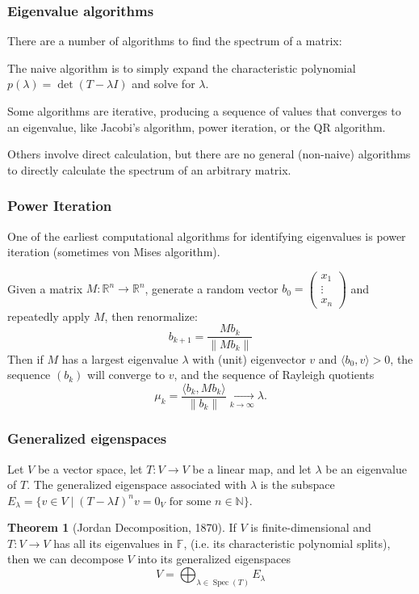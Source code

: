 \documentclass{beamer}
\newcommand{\R}{\mathbb{R}}
\newcommand{\N}{\mathbb{N}}
\DeclareMathOperator{\Spec}{Spec}
\newcommand{\norm}[1]{\left\lVert#1\right\rVert}
\theoremstyle{definition}
\newtheorem*{theorem*}{Theorem}
\begin{document}
\begin{frame}
    \frametitle{Eigenvalue algorithms}

    There are a number of algorithms to find the spectrum of a matrix:

    \pause
    The naive algorithm is to simply expand the characteristic polynomial $p(\lambda) = \det(T - \lambda I)$ and solve for $\lambda$.

    \pause
    Some algorithms are iterative, producing a sequence of values that converges to an eigenvalue, like Jacobi's algorithm, power iteration, or the QR algorithm.

    \pause
    Others involve direct calculation, but there are no general (non-naive) algorithms to directly calculate the spectrum of an arbitrary matrix.
\end{frame}

\begin{frame}
    \frametitle{Power Iteration}

    One of the earliest computational algorithms for identifying eigenvalues is power iteration (sometimes von Mises algorithm).

    \pause
    Given a matrix $M : \R^n \longrightarrow \R^n$, generate a random vector $b_0 = \begin{pmatrix} x_1 \\ \vdots \\ x_n \end{pmatrix}$ and repeatedly apply $M$, then renormalize:
    \[
        b_{k+1} = \frac{M b_k}{\norm{M b_k}}
    \]
    \pause
    Then if $M$ has a largest eigenvalue $\lambda$ with (unit) eigenvector $v$ and $\langle b_0, v \rangle > 0$,
    the sequence $(b_k)$ will converge to $v$, and the sequence of Rayleigh quotients
    \[
        \mu_k = \frac{\langle b_k, M b_k \rangle}{\norm{b_k}} \xrightarrow[k\to\infty]{} \lambda.
    \]
\end{frame}

\begin{frame}
    \frametitle{Generalized eigenspaces}

    \begin{definition}
        Let $V$ be a vector space, let $T: V \longrightarrow V$ be a linear map, and let $\lambda$ be an eigenvalue of $T$.
        The generalized eigenspace associated with $\lambda$ is the subspace $E_\lambda = \{v \in V \mid (T - \lambda I)^n v = 0_V \text{ for some } n \in \N\}$.
    \end{definition}
    \begin{theorem*}[Jordan Decomposition, 1870]
        If $V$ is finite-dimensional and $T: V \longrightarrow V$ has all its eigenvalues in $\mathbb{F}$, (i.e. its characteristic polynomial splits), then
        we can decompose $V$ into its generalized eigenspaces
        \[
            V = \bigoplus_{\lambda \in \Spec(T)} E_\lambda  
        \]
    \end{theorem*}
\end{frame}
\end{document}
